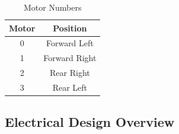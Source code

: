 \documentclass[letterpaper,12pt]{article}
\begin{document}
\begin{table}[h!]
  \centering
  \begin{tabular}{| c | c |}
    \hline
    \textbf{Motor} & \textbf{Position} \\
    \hline
    0 & Forward Left \\
    \hline
    1 & Forward Right \\
    \hline
    2 & Rear Right \\
    \hline
    3 & Rear Left \\
    \hline
  \end{tabular}
  \caption{Motor Numbers}
  \label{tab:motor_nums}
\end{table}

\subsection{Electrical Design Overview}
\end{document}

